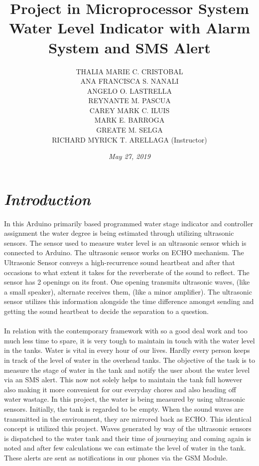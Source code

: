\documentclass[11pt]{article}
\title {Project in Microprocessor System \\Water Level Indicator with Alarm System and SMS Alert}
\author {THALIA MARIE C. CRISTOBAL \\ 

ANA FRANCISCA S. NANALI\\

ANGELO O. LASTRELLA \\

REYNANTE M. PASCUA  \\

CAREY MARK C. ILUIS \\

MARK E. BARROGA \\
 
GREATE M. SELGA \\

RICHARD MYRICK T. ARELLAGA (Instructor)}
\affil{\textbf{Bachelor of Science in Computer Engineering} 
\\ 
\textbf{College of Engineering and Architecture}
\\
\textit{Urdaneta City University}}
\date{\emph{May 27, 2019}}
\begin{document}
\maketitle
\newpage
{}
\tableofcontents                                                                   

\newpage
{}

\section{\emph{Introduction}}

\paragraph{} {\large In this Arduino primarily based programmed water stage indicator and controller assignment the water degree is being estimated through utilizing ultrasonic sensors. The sensor used to measure water level is an ultrasonic sensor which is connected to Arduino. The ultrasonic sensor works on ECHO mechanism. The Ultrasonic Sensor conveys a high-recurrence sound heartbeat and after that occasions to what extent it takes for the reverberate of the sound to reflect. The sensor has 2 openings on its front. One opening transmits ultrasonic waves, (like a small speaker), alternate receives them, (like a minor amplifier). The ultrasonic sensor utilizes this information alongside the time difference amongst sending and getting the sound heartbeat to decide the separation to a question.}

\paragraph{} {\large In relation with the contemporary framework with so a good deal work and too much less time to spare, it is very tough to maintain in touch with the water level in the tanks. Water is vital in every hour of our lives. Hardly every person keeps in track of the level of water in the overhead tanks. The objective of the task is to measure the stage of water in the tank and notify the user about the water level via an SMS alert. This now not solely helps to maintain the tank full however also making it more convenient for our everyday chores and also heading off water wastage. In this project, the water is being measured by using ultrasonic sensors. Initially, the tank is regarded to be empty. When the sound waves are transmitted in the environment, they are mirrored back as ECHO. This identical concept is utilized this project. Waves generated by way of the ultrasonic sensors is dispatched to the water tank and their time of journeying and coming again is noted and after few calculations we can estimate the level of water in the tank. These alerts are sent as notifications in our phones via the GSM Module.}
\end{document}
